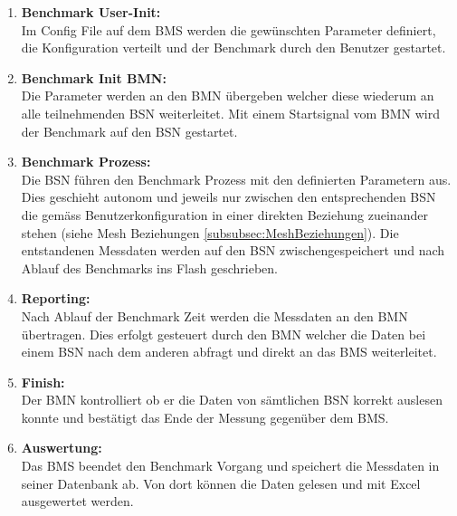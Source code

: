 \begin{enumerate}
	\item \textbf{Benchmark User-Init:}\\
	Im Config File auf dem BMS werden die gewünschten Parameter definiert, die Konfiguration verteilt und der Benchmark durch den Benutzer gestartet.
	\item \textbf{Benchmark Init BMN:}\\
	Die Parameter werden an den BMN übergeben welcher diese wiederum an alle teilnehmenden BSN weiterleitet. Mit einem Startsignal vom BMN wird der Benchmark auf den BSN gestartet.
	\item \textbf{Benchmark Prozess:}\\
	Die BSN führen den Benchmark Prozess mit den definierten Parametern aus. Dies geschieht autonom und jeweils nur zwischen den entsprechenden BSN die gemäss Benutzerkonfiguration in einer direkten Beziehung zueinander stehen (siehe Mesh Beziehungen \ref{subsubsec:MeshBeziehungen}). Die entstandenen Messdaten werden auf den BSN zwischengespeichert und nach Ablauf des Benchmarks ins Flash geschrieben.
	\item \textbf{Reporting:}\\
	Nach Ablauf der Benchmark Zeit werden die Messdaten an den BMN übertragen. Dies erfolgt gesteuert durch den BMN welcher die Daten bei einem BSN nach dem anderen abfragt und direkt an das BMS weiterleitet.
	\item \textbf{Finish:}\\
	Der BMN kontrolliert ob er die Daten von sämtlichen BSN korrekt auslesen konnte und bestätigt das Ende der Messung gegenüber dem BMS.
	\item \textbf{Auswertung:}\\
	Das BMS beendet den Benchmark Vorgang und speichert die Messdaten in seiner Datenbank ab. Von dort können die Daten gelesen und mit Excel ausgewertet werden.
\end{enumerate}

